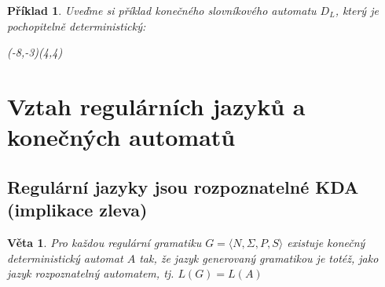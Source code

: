 \documentclass[10pt, a4paper, titlepage]{article}
\theoremstyle{note}
\newtheorem{veta}{Věta}
\newtheorem{priklad}{Příklad}
\begin{document}
\begin{priklad}
Uveďme si příklad konečného slovníkového automatu $D_{L}$, který je pochopitelně deterministický:



\begin{VCPicture}{(-8,-3)(4,4)}
\LargeState
{}



\end{VCPicture}

\end{priklad}


\section{Vztah regulárních jazyků a konečných automatů}

\subsection{Regulární jazyky jsou rozpoznatelné KDA (implikace zleva)}

\begin{veta}
Pro každou regulární gramatiku $G=\langle N,\Sigma,P,S \rangle$ existuje konečný deterministický automat $A$ tak, že jazyk generovaný gramatikou je totéž, jako jazyk rozpoznatelný automatem, tj. $L(G)=L(A)$
\end{veta} 
\end{document}
